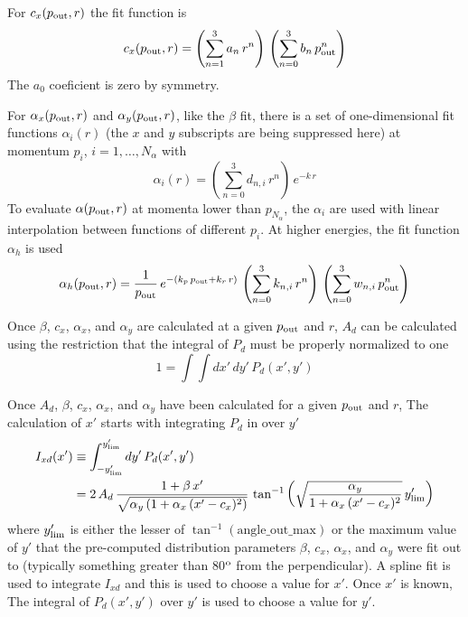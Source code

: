 For $c_x(p_{\text{out}},r)$ the fit function is
\begin{equation}
  c_x(p_{\text{out}},r) = \left( \sum_{n=1}^3 a_{n} \, r^n \right) \, 
  \left( \sum_{n=0}^3 b_{n} \, p_{\text{out}}^n \right)
\end{equation}
The $a_0$ coeficient is zero by symmetry.

For $\alpha_x(p_{\text{out}},r)$ and $\alpha_y(p_{\text{out}},r)$, like the $\beta$ fit, there is a set of
one-dimensional fit functions $\alpha_i(r)$ (the $x$ and $y$ subscripts are being suppressed here)
at momentum $p_i$, $i = 1, \ldots, N_\alpha$ with
\begin{equation}
  \alpha_i(r) = \left( \sum_{n=0}^3 d_{n,i} \, r^n \right) \, e^{-k \, r}
\end{equation}
To evaluate $\alpha(p_{\text{out}},r)$ at momenta lower than $p_{N_\alpha}$, the $\alpha_i$ are used with
linear interpolation between functions of different $p_i$.  At higher energies, the fit function
$\alpha_h$ is used
\begin{equation}
  \alpha_h(p_{\text{out}},r) = \frac{1}{p_{\text{out}}} \, e^{-(k_p \, p_{\text{out}} + k_r \, r)} \,
  \left( \sum_{n=0}^3 k_{n,i} \, r^n \right) \, \left( \sum_{n=0}^3 w_{n,i} \, p_{\text{out}}^n \right)
\end{equation}

Once $\beta$, $c_x$, $\alpha_x$, and $\alpha_y$ are calculated at a given $p_{\text{out}}$ and $r$,
$A_d$ can be calculated using the restriction that the integral of $P_d$ must be properly normalized
to one
\begin{equation}
  1 = \int \int dx' \, dy' \,
  P_d \left( x', y' \right)
\end{equation}

Once $A_d$, $\beta$, $c_x$, $\alpha_x$, and $\alpha_y$ have been calculated for a given $p_{\text{out}}$ and
$r$, The calculation of $x'$ starts with integrating $P_d$ in  over $y'$
\begin{align} 
  I_{xd} (x') &\equiv \int_{-y'_{\text{lim}}}^{y'_{\text{lim}}} dy' \, P_d(x', y')
  \label{ixdyp} \\
  &= 2 \, A_d \, \frac{1 + \beta \, x'}{\sqrt{ \alpha_y \, (1 + \alpha_x \, (x' - c_x)^2) }} \,
  \tan^{-1} \left( \sqrt{ \frac{\alpha_y}{1 + \alpha_x \, (x' - c_x)^2} } \, y'_{\text{lim}} \right)
  \nonumber
\end{align}
where $y'_{\text{lim}}$ is either the lesser of $\tan^{-1}(\text{angle_out_max})$ or the maximum
value of $y'$ that the pre-computed distribution parameters $\beta$, $c_x$, $\alpha_x$, and
$\alpha_y$ were fit out to (typically something greater than 80$^{\text{o}}$ from the perpendicular).
A spline fit is used to integrate $I_{xd}$ and this is used to choose a value for $x'$. Once $x'$
is known, The integral of $P_d(x', y')$ over $y'$ is used to choose a value for $y'$.

